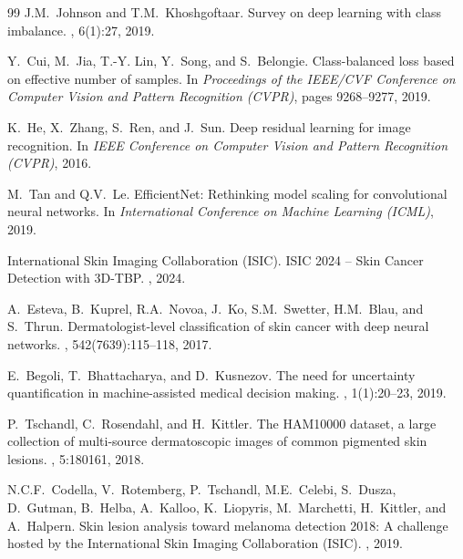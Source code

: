\documentclass[11pt, a4paper]{article}
\begin{document}
\begin{thebibliography}{99}
J.M.~Johnson and T.M.~Khoshgoftaar.
\newblock Survey on deep learning with class imbalance.
, 6(1):27, 2019.

Y.~Cui, M.~Jia, T.-Y. Lin, Y.~Song, and S.~Belongie.
\newblock Class-balanced loss based on effective number of samples.
\newblock In {\em Proceedings of the IEEE/CVF Conference on Computer Vision and Pattern Recognition (CVPR)}, pages 9268--9277, 2019.


K.~He, X.~Zhang, S.~Ren, and J.~Sun.
\newblock Deep residual learning for image recognition.
\newblock In {\em IEEE Conference on Computer Vision and Pattern Recognition (CVPR)}, 2016.

M.~Tan and Q.V.~Le.
\newblock EfficientNet: Rethinking model scaling for convolutional neural networks.
\newblock In {\em International Conference on Machine Learning (ICML)}, 2019.


International Skin Imaging Collaboration (ISIC).
\newblock ISIC 2024 -- Skin Cancer Detection with 3D-TBP.
, 2024.

A.~Esteva, B.~Kuprel, R.A.~Novoa, J.~Ko, S.M.~Swetter, H.M.~Blau, and S.~Thrun.
\newblock Dermatologist-level classification of skin cancer with deep neural networks.
, 542(7639):115--118, 2017.

E.~Begoli, T.~Bhattacharya, and D.~Kusnezov.
\newblock The need for uncertainty quantification in machine-assisted medical decision making.
, 1(1):20--23, 2019.

P.~Tschandl, C.~Rosendahl, and H.~Kittler.
\newblock The {HAM10000} dataset, a large collection of multi-source dermatoscopic images of common pigmented skin lesions.
, 5:180161, 2018.

N.C.F.~Codella, V.~Rotemberg, P.~Tschandl, M.E.~Celebi, S.~Dusza, D.~Gutman, B.~Helba, A.~Kalloo, K.~Liopyris, M.~Marchetti, H.~Kittler, and A.~Halpern.
\newblock Skin lesion analysis toward melanoma detection 2018: A challenge hosted by the International Skin Imaging Collaboration (ISIC).
, 2019.


\end{thebibliography}
\end{document}
